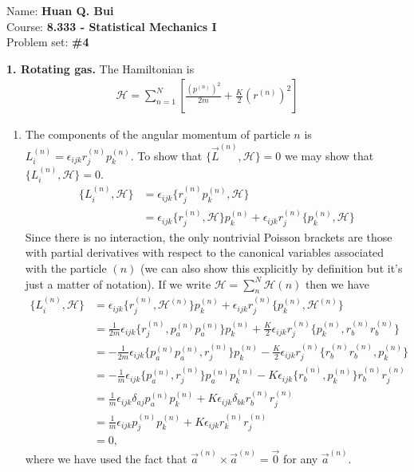 \documentclass{article}
\theoremstyle{definition}
\newcommand{\ham}{\mathcal{H}}
\newcommand{\f}[2]{\frac{#1}{#2}}
\newcommand{\lb}{\left[}
\newcommand{\rb}{\right]}
\begin{document}
		\begin{framed}
			\noindent Name: \textbf{Huan Q. Bui}\\
			Course: \textbf{8.333 - Statistical Mechanics I}\\
			Problem set: \textbf{\#4}
		\end{framed}
	




\noindent \textbf{1. Rotating gas.} The Hamiltonian is 
\begin{align*}
\ham = \sum^N_{n=1} \lb \f{(p^{(n)})^2}{2m} + \f{K}{2} (r^{(n)})^2 \rb
\end{align*}

\begin{enumerate}[label=(\alph*)]
	\item The components of the angular momentum of particle $n$ is $L_i^{(n)} = \epsilon_{ijk} r^{(n)}_j p^{(n)}_k$. To show that $\{ \vec{L}^{(n)},\ham\} = 0$ we may show that $\{ L^{(n)}_i, \ham\} = 0$.
	\begin{align*}
	\{ L_i^{(n)} , \ham\} 
	&= \epsilon_{ijk}\{ r_j^{(n)} p_k^{(n)},  \ham \}\\
	&= \epsilon_{ijk}\{ r_j^{(n)},\ham \}p_k^{(n)} + \epsilon_{ijk} r_j^{(n)} \{ p_k^{(n)},\ham  \}
	\end{align*}
	Since there is no interaction, the only nontrivial Poisson brackets are those with partial derivatives with respect to the canonical variables associated with the particle $(n)$ (we can also show this explicitly by definition but it's just a matter of notation). If we write $\ham = \sum_n^N \ham(n)$ then we have
	\begin{align*}
	\{ L_i^{(n)} , \ham\} 
	&= \epsilon_{ijk}\{ r_j^{(n)},\ham^{(n)} \}p_k^{(n)} + \epsilon_{ijk} r_j^{(n)} \{ p_k^{(n)},\ham^{(n)}  \}\\
	&= \f{1}{2m}\epsilon_{ijk}\{ r_j^{(n)}, p^{(n)}_a p^{(n)}_a  \}p_k^{(n)} + \f{K}{2}\epsilon_{ijk} r_j^{(n)} \{ p_k^{(n)}, r^{(n)}_b r^{(n)}_b  \}\\
	&= -\f{1}{2m}\epsilon_{ijk}\{ p^{(n)}_a p^{(n)}_a , r_j^{(n)} \}p_k^{(n)} - \f{K}{2}\epsilon_{ijk} r_j^{(n)} \{  r^{(n)}_b r^{(n)}_b, p_k^{(n)}  \}\\
	&= -\f{1}{m}\epsilon_{ijk}\{ p^{(n)}_a  , r_j^{(n)} \}  p_a^{(n)} p_k^{(n)} - K\epsilon_{ijk}  \{  r^{(n)}_b , p_k^{(n)}  \} r^{(n)}_b r_j^{(n)}\\
	&= \f{1}{m}\epsilon_{ijk} \delta_{aj} p_a^{(n)}p_k^{(n)} + K\epsilon_{ijk}\delta_{bk}r_b^{(n)}r_j^{(n)}\\
	&= \f{1}{m}\epsilon_{ijk} p_j^{(n)} p_k^{(n)} + K \epsilon_{ijk} r_k^{(n)} r_j^{(n)}\\
	&= 0,
	\end{align*}
	where we have used the fact that $\vec{a}^{(n)} \times \vec{a}^{(n)} = \vec{0}$ for any $\vec{a}^{(n)}$.
	

\end{enumerate}
\end{document}
